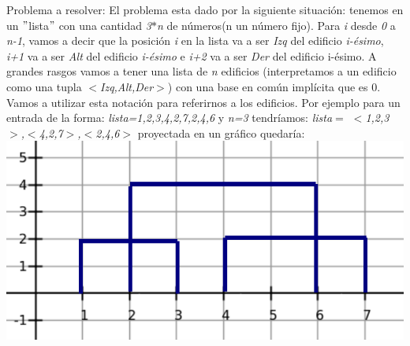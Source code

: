 \documentclass{article}
\begin{document}
{\noindent \Huge Problema a resolver:}
\newline \newline  El problema esta dado por la siguiente situaci\'on: 
tenemos en un $"$lista$"$ con una cantidad \textit{3$*$n} de n\'umeros(n un n\'umero fijo).\newline
Para \textit{i} desde \textit{0} a \textit{n-1}, vamos a decir que la posici\'on \textit{i} en la lista va a ser \textit{Izq} del edificio \textit{i-\'esimo}, \textit{i+1} va a ser \textit{Alt} del edificio \textit{i-\'esimo} e \textit{i+2} va a ser \textit{Der} del edificio i-\'esimo.\newline
A grandes rasgos vamos a tener una lista de \textit{n} edificios (interpretamos a un edificio como una tupla \textit{$<$Izq,Alt,Der$>$}) con una base en com\'un impl\'icita que es 0.\newline
Vamos a utilizar esta notación para referirnos a los edificios.\newline
Por ejemplo para un entrada de la forma: \newline
\textit{lista={1,2,3,4,2,7,2,4,6}} y 
\textit{n=3} tendr\'iamos: \newline 
\textit{lista$=$ $<$1,2,3$>$,$<$4,2,7$>$,$<$2,4,6$>$} proyectada en un gr\'afico quedar\'ia: \newline
\vspace{0.4cm}
\includegraphics[width=\textwidth,height=\textheight,keepaspectratio
]{edificiosGraf1.png}
\begin {flushleft}
\end{flushleft}
\end{document}
